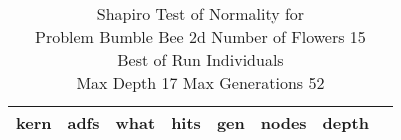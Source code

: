 \begin{table}[H]
\caption{Shapiro Test of Normality for \\ Problem  Bumble Bee 2d  Number of Flowers 15\\Best of Run Individuals \\ Max Depth 17 Max Generations 52\\}
\begin{center}
\scalebox{0.8} %
{
\begin{tabular}{lrrrrrrr}
\hline
kern & adfs & what & hits & gen & nodes & depth \\
\hline


\end{tabular}
}
\end{center}
\end{table}

